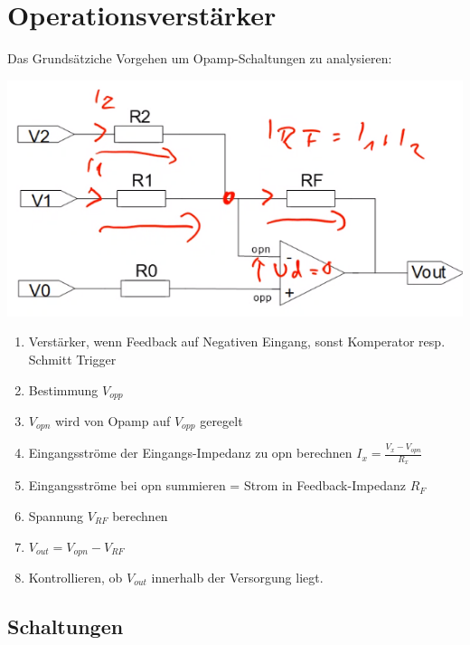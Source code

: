 \section{Operationsverstärker}
Das Grundsätziche Vorgehen um Opamp-Schaltungen zu analysieren:
\begin{center}
	\includegraphics[width=0.5\linewidth]{Images/opamp_todo}
\end{center}

\begin{enumerate}[nosep]
	\item Verstärker, wenn Feedback auf Negativen Eingang, sonst Komperator resp. Schmitt Trigger
	\item Bestimmung $V_{opp}$
	\item $V_{opn}$ wird von Opamp auf $V_{opp}$ geregelt
	\item Eingangsströme der Eingangs-Impedanz zu opn berechnen $I_x = \frac{V_x - V_{opn}}{R_x}$
	\item Eingangsströme bei opn summieren = Strom in Feedback-Impedanz $R_F$
	\item Spannung $V_{RF}$ berechnen
	\item $V_{out} = V_{opn} - V_{RF}$
	\item Kontrollieren, ob $V_{out}$ innerhalb der Versorgung liegt.
\end{enumerate}

\subsection{Schaltungen}
